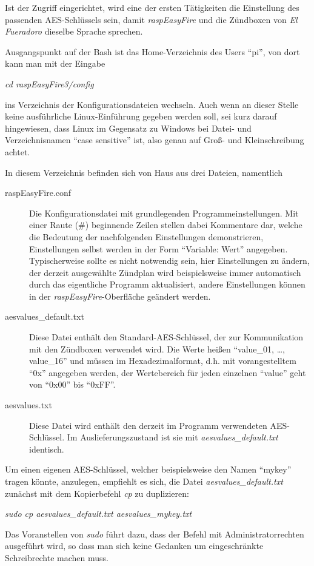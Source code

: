 \documentclass[paper=a4, parskip, numbers=noenddot, toc=listof, headsepline]{scrbook}
\newcommand{\anlage}{\emph{El Fueradoro}}
\newcommand{\REF}{\emph{raspEasyFire}}
\begin{document}
			Ist der Zugriff eingerichtet, wird eine der ersten Tätigkeiten die Einstellung des passenden AES-Schlüssels sein, damit {\REF} und die Zündboxen von {\anlage} dieselbe Sprache sprechen.

			Ausgangspunkt auf der Bash ist das Home-Verzeichnis des Users \enquote{pi}, von dort kann man mit der Eingabe
			\begin{center}
				\emph{cd raspEasyFire3/config}
			\end{center}
			ins Verzeichnis der Konfigurationsdateien wechseln. Auch wenn an dieser Stelle keine ausführliche Linux-Einführung gegeben werden soll, sei kurz darauf hingewiesen, dass Linux im Gegensatz zu Windows bei Datei- und Verzeichnisnamen \enquote{case sensitive} ist, also genau auf Groß- und Kleinschreibung achtet.

			In diesem Verzeichnis befinden sich von Haus aus drei Dateien, namentlich
			\begin{description}
				\item[raspEasyFire.conf] Die Konfigurationsdatei mit grundlegenden Programmeinstellungen. Mit einer Raute (\#) beginnende Zeilen stellen dabei Kommentare dar, welche die Bedeutung der nachfolgenden Einstellungen demonstrieren, Einstellungen selbst werden in der Form \enquote{Variable: Wert} angegeben. Typischerweise sollte es nicht notwendig sein, hier Einstellungen zu ändern, der derzeit ausgewählte Zündplan wird beispielsweise immer automatisch durch das eigentliche Programm aktualisiert, andere Einstellungen können in der {\REF}-Oberfläche geändert werden.
				\item[aesvalues\_default.txt] Diese Datei enthält den Standard-AES-Schlüssel, der zur Kommunikation mit den Zündboxen verwendet wird. Die Werte heißen \enquote{value\_01, \dots, value\_16} und müssen im Hexadezimalformat, d.h. mit vorangestelltem \enquote{0x} angegeben werden, der Wertebereich für jeden einzelnen \enquote{value} geht von \enquote{0x00} bis \enquote{0xFF}.
				\item[aesvalues.txt] Diese Datei wird enthält den derzeit im Programm verwendeten AES-Schlüssel. Im Auslieferungszustand ist sie mit \emph{aesvalues\_default.txt} identisch.
			\end{description}

			Um einen eigenen AES-Schlüssel, welcher beispielsweise den Namen \enquote{mykey} tragen könnte, anzulegen, empfiehlt es sich, die Datei \emph{aesvalues\_default.txt} zunächst mit dem Kopierbefehl \emph{cp} zu duplizieren:
			\begin{center}
				\emph{sudo cp aesvalues\_default.txt aesvalues\_mykey.txt}
			\end{center}
			Das Voranstellen von \emph{sudo} führt dazu, dass der Befehl mit Administratorrechten ausgeführt wird, so dass man sich keine Gedanken um eingeschränkte Schreibrechte machen muss.
\end{document}

